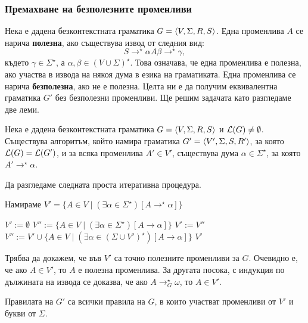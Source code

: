 \subsubsection*{Премахване на безполезните променливи}

Нека е дадена безконтекстната граматика $G = \langle{V,\Sigma,R,S}\rangle$.
Една променлива $A$ се нарича {\bf полезна}, ако съществува извод от следния вид:
\[S \to^\star \alpha A \beta \to^\star \gamma,\]
където $\gamma \in \Sigma^\star$, а $\alpha,\beta \in (V \cup \Sigma)^\star$.
Това означава, че една променлива е полезна, ако участва в извода на някоя дума в езика на граматиката.
Една променлива се нарича {\bf безполезна}, ако не е полезна.
Целта ни е да получим еквивалентна граматика $G'$ без безполезни променливи.
Ще решим задачата като разгледаме две леми.

\begin{lemma}
  \label{lem:useless1}
  Нека е дадена безконтекстната граматика $G = \langle{V,\Sigma,R,S}\rangle$ и $\mathcal{L}(G) \neq \emptyset$.
  Съществува алгоритъм, който намира граматика $G' = \langle{V',\Sigma,S,R'}\rangle$, за която 
  $\mathcal{L}(G) = \mathcal{L}(G')$, и за всяка променлива $A' \in V'$, съществува дума $\alpha \in \Sigma^\star$,
  за която $A' \to^\star \alpha$.
\end{lemma}
\begin{hint}
  Да разгледаме следната проста итеративна процедура.
  \begin{algorithm}[H]
    \caption{Намираме $V' = \{A \in V\mid (\exists \alpha \in \Sigma^\star)[A \to^\star \alpha]\}$}
    \label{alg:useless}
    \begin{algorithmic}[1]
      \State $V' := \emptyset$
      \State $V'' := \{A \in V \mid (\exists \alpha \in \Sigma^\star)[A \to \alpha]\}$
      \State $V' := V''$
      \State $V'' := V' \cup \{A \in V \mid (\exists \alpha \in (\Sigma \cup V')^\star)[A \to \alpha]\}$
      \EndWhile
      \State \Return $V'$
    \end{algorithmic}
  \end{algorithm}
  Трябва да докажем, че във $V'$ са точно полезните променливи за $G$.
  Очевидно е, че ако $A \in V'$, то $A$ е полезна променлива.
  За другата посока, с индукция по дължината на извода се доказва, че ако $A \to^\star_G \omega$,
  то $A \in V'$.
  
  Правилата на $G'$ са всички правила на $G$, в които участват променливи от $V'$ и букви от $\Sigma$.
\end{hint}

